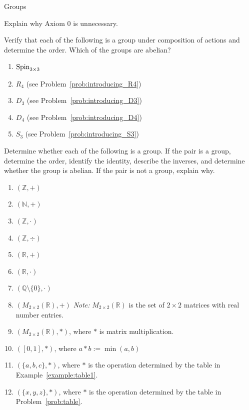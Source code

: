 \begin{section}{Groups}
\begin{problem}
Explain why Axiom 0 is unnecessary.
\end{problem}

\begin{problem}
Verify that each of the following is a group under composition of actions and determine the order. Which of the groups are abelian?
\begin{enumerate}[label=\textrm{(\alph*)}]
\item $\operatorname{Spin}_{3\times 3}$
\item $R_4$ (see Problem~\ref{prob:introducing_R4})
\item $D_3$ (see Problem~\ref{prob:introducing_D3})
\item $D_4$ (see Problem~\ref{prob:introducing_D4})
\item $S_3$ (see Problem~\ref{prob:introducing_S3})
\end{enumerate}
\end{problem}

\begin{problem}
Determine whether each of the following is a group.  If the pair is a group, determine the order, identify the identity, describe the inverses, and determine whether the group is abelian. If the pair is not a group, explain why.
\begin{enumerate}[label=\textrm{(\alph*)}]
\item $(\mathbb{Z},+)$
\item $(\mathbb{N},+)$
\item $(\mathbb{Z},\cdot)$
\item $(\mathbb{Z},\div)$
\item $(\mathbb{R},+)$
\item $(\mathbb{R},\cdot)$
\item $(\mathbb{Q}\setminus \{0\},\cdot)$
\item $(M_{2\times 2}(\mathbb{R}),+)$ \quad \emph{Note:} $M_{2\times 2}(\mathbb{R})$ is the set of $2\times 2$ matrices with real number entries.
\item $(M_{2\times 2}(\mathbb{R}),*)$, where $*$ is matrix multiplication.
\item $([0,1],*)$, where $a*b:=\min(a,b)$
\item $(\{a,b,c\},*)$, where $*$ is the operation determined by the table in Example~\ref{example:table1}.
\item $(\{x,y,z\},*)$, where $*$ is the operation determined by the table in Problem~\ref{prob:table}.
\end{enumerate}
\end{problem}


\end{section}
